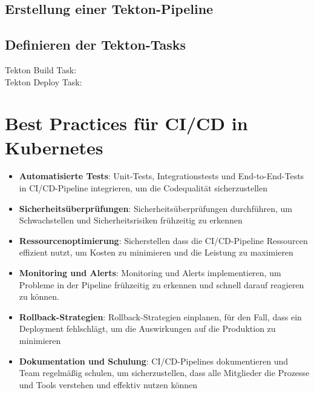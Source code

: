 \subsection{Erstellung einer Tekton-Pipeline}

\newpage

\subsection{Definieren der Tekton-Tasks}
Tekton Build Task:\\


\noindent
Tekton Deploy Task:\\


\section{Best Practices für CI/CD in Kubernetes}
\begin{itemize}
    \item \textbf{Automatisierte Tests}: Unit-Tests, Integrationstests und End-to-End-Tests in CI/CD-Pipeline integrieren, um die Codequalität sicherzustellen
    \item \textbf{Sicherheitsüberprüfungen}: Sicherheitsüberprüfungen durchführen, um Schwachstellen und Sicherheitsrisiken frühzeitig zu erkennen
    \item \textbf{Ressourcenoptimierung}: Sicherstellen dass die CI/CD-Pipeline Ressourcen effizient nutzt, um Kosten zu minimieren und die Leistung zu maximieren
    \item \textbf{Monitoring und Alerts}: Monitoring und Alerts implementieren, um Probleme in der Pipeline frühzeitig zu erkennen und schnell darauf reagieren zu können.
    \item \textbf{Rollback-Strategien}: Rollback-Strategien einplanen, für den Fall, dass ein Deployment fehlschlägt, um die Auswirkungen auf die Produktion zu minimieren
    \item \textbf{Dokumentation und Schulung}: CI/CD-Pipelines dokumentieren und Team regelmäßig schulen, um sicherzustellen, dass alle Mitglieder die Prozesse und Tools verstehen und effektiv nutzen können
\end{itemize}
